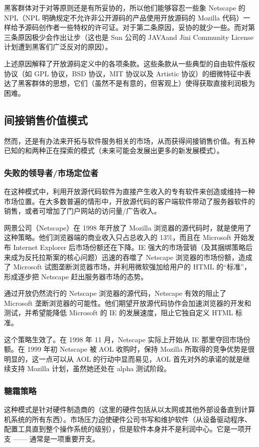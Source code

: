 黑客群体对于对等原则还是有所妥协的，所以他们能够容忍一些象 Netscape 的 NPL（NPL 明确规定不允许非公开源码的产品使用开放源码的 Mozilla 代码）一样给予源码创作者一些特权的许可证。对于第二条原因，妥协的就少一些。而对第三条原因极少会作出让步（这也是 Sun 公司的 JAVAand Jini Community License 计划遭到黑客们广泛反对的原因）。


上述原因解释了开放源码定义中的各项条款。这些条款从一些典型的自由软件版权协议（如 GPL 协议，BSD 协议，MIT 协议以及 Artistic 协议）的细微特征中表达了黑客群体的思想，它们（虽然不是有意的，但客观上）使得获取直接利润极为困难。

\subsection{间接销售价值模式}
然而，还是有办法来开拓与软件服务相关的市场，从而获得间接销售价值。有五种已知的和两种正在探索的模式（未来可能会发展出更多的新发展模式）。

\subsubsection{失败的领导者/市场定位者}
在这种模式中，利用开放源代码软件为直接产生收入的专有软件来创造或维持一种市场位置。在大多数普遍的情形中，开放源代码的客户端软件带动了服务器软件的销售，或者可增加了门户网站的访问量/广告收入。


网景公司（Netscape）在 1998 年开放了 Mozilla 浏览器的源代码时，就是使用了这种策略。他们浏览器端的商业收入只占总收入的 13\%，而且在 Microsoft 开始发布 Internet Explorer 后市场份额还在下降。IE 强大的市场营销（及其捆绑策略后来成为反托拉斯案的核心问题）迅速的吞噬了 Netscape 浏览器的市场份额，造成了 Microsoft 试图垄断浏览器市场，并利用微软强加给用户的 HTML 的“标准”，形成逐步把 Netscape 赶出服务器市场的态势。


通过开放仍然流行的 Netscape 浏览器的源代码，Netscape 有效的阻止了 Microsoft 垄断浏览器的可能性。他们期望开放源代码协作会加速浏览器的开发和测试，并希望能降低 Microsoft 的 IE 的发展速度，阻止它独自定义 HTML 标准。


这个策略生效了。在 1998 年 11 月，Netscape 实际上开始从 IE 那里夺回市场份额。在 1999 年初 Netscape 被 AOL 收购时，保持 Mozilla 所取得的竞争优势是很明显的，这一点可以从 AOL 的行动中显而易见，AOL 首先对外的承诺的就是继续支持 Mozilla 计划，虽然她还处在 alpha 测试阶段。

\subsubsection{糖霜策略}
这种模式是针对硬件制造商的（这里的硬件包括从以太网或其他外部设备直到计算机系统的所有东西）。市场压力迫使硬件公司书写和维护软件（从设备驱动程序、配置工具直到整个操作系统的级别），但是软件本身并不是利润中心。它是一项开支 —— 通常是一项重要开支。


